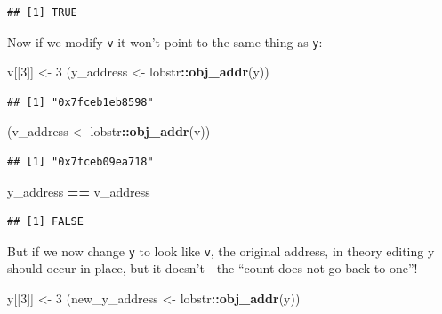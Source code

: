 \documentclass[]{book}
\newenvironment{Shaded}{\begin{snugshade}}{\end{snugshade}}
\newcommand{\DecValTok}[1]{\textcolor[rgb]{0.00,0.00,0.81}{#1}}
\newcommand{\KeywordTok}[1]{\textcolor[rgb]{0.13,0.29,0.53}{\textbf{#1}}}
\newcommand{\NormalTok}[1]{#1}
\newcommand{\OperatorTok}[1]{\textcolor[rgb]{0.81,0.36,0.00}{\textbf{#1}}}
\newcommand{\StringTok}[1]{\textcolor[rgb]{0.31,0.60,0.02}{#1}}
\begin{document}
\begin{verbatim}
## [1] TRUE
\end{verbatim}

Now if we modify \texttt{v} it won't point to the same thing as \texttt{y}:

\begin{Shaded}
\begin{Highlighting}[]
\NormalTok{v[[}\DecValTok{3}\NormalTok{]] <-}\StringTok{ }\DecValTok{3}
\NormalTok{(y_address <-}\StringTok{ }\NormalTok{lobstr}\OperatorTok{::}\KeywordTok{obj_addr}\NormalTok{(y))}
\end{Highlighting}
\end{Shaded}

\begin{verbatim}
## [1] "0x7fceb1eb8598"
\end{verbatim}

\begin{Shaded}
\begin{Highlighting}[]
\NormalTok{(v_address <-}\StringTok{ }\NormalTok{lobstr}\OperatorTok{::}\KeywordTok{obj_addr}\NormalTok{(v))}
\end{Highlighting}
\end{Shaded}

\begin{verbatim}
## [1] "0x7fceb09ea718"
\end{verbatim}

\begin{Shaded}
\begin{Highlighting}[]
\NormalTok{y_address }\OperatorTok{==}\StringTok{ }\NormalTok{v_address}
\end{Highlighting}
\end{Shaded}

\begin{verbatim}
## [1] FALSE
\end{verbatim}

But if we now change \texttt{y} to look like \texttt{v}, the original address, in theory editing y should occur in place, but it doesn't - the ``count does not go back to one''!

\begin{Shaded}
\begin{Highlighting}[]
\NormalTok{y[[}\DecValTok{3}\NormalTok{]] <-}\StringTok{ }\DecValTok{3}
\NormalTok{(new_y_address <-}\StringTok{ }\NormalTok{lobstr}\OperatorTok{::}\KeywordTok{obj_addr}\NormalTok{(y))}
\end{Highlighting}
\end{Shaded}
\end{document}
